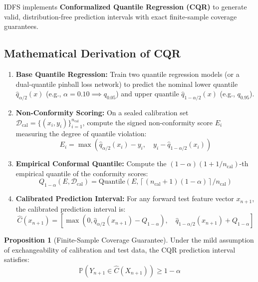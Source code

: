 \documentclass[12pt,a4paper,oneside]{report}
\theoremstyle{definition}
\newtheorem{proposition}{Proposition}[chapter]
\begin{document}
IDFS implements \textbf{Conformalized Quantile Regression (CQR)} to generate valid, distribution-free prediction intervals with exact finite-sample coverage guarantees.

\subsection{Mathematical Derivation of CQR}
\begin{enumerate}
    \item \textbf{Base Quantile Regression:} Train two quantile regression models (or a dual-quantile pinball loss network) to predict the nominal lower quantile $\hat{q}_{\alpha/2}(x)$ (e.g., $\alpha = 0.10 \implies q_{0.05}$) and upper quantile $\hat{q}_{1-\alpha/2}(x)$ (e.g., $q_{0.95}$).
    \item \textbf{Non-Conformity Scoring:} On a sealed calibration set $\mathcal{D}_{\text{cal}} = \{(x_i, y_i)\}_{i=1}^{n_{\text{cal}}}$, compute the signed non-conformity score $E_i$ measuring the degree of quantile violation:
    \begin{equation}
    E_i = \max\left(\hat{q}_{\alpha/2}(x_i) - y_i, \quad y_i - \hat{q}_{1-\alpha/2}(x_i)\right)
    \end{equation}
    \item \textbf{Empirical Conformal Quantile:} Compute the $(1-\alpha)(1 + 1/n_{\text{cal}})$-th empirical quantile of the conformity scores:
    \begin{equation}
    Q_{1-\alpha}(E, \mathcal{D}_{\text{cal}}) = \text{Quantile}\left(E, \left\lceil (n_{\text{cal}} + 1)(1 - \alpha) \right\rceil / n_{\text{cal}}\right)
    \end{equation}
    \item \textbf{Calibrated Prediction Interval:} For any forward test feature vector $x_{n+1}$, the calibrated prediction interval is:
    \begin{equation}
    \hat{C}(x_{n+1}) = \left[ \max\left(0, \hat{q}_{\alpha/2}(x_{n+1}) - Q_{1-\alpha}\right), \quad \hat{q}_{1-\alpha/2}(x_{n+1}) + Q_{1-\alpha} \right]
    \end{equation}
\end{enumerate}

\begin{proposition}[Finite-Sample Coverage Guarantee]
Under the mild assumption of exchangeability of calibration and test data, the CQR prediction interval satisfies:
\begin{equation}
\mathbb{P}\left(Y_{n+1} \in \hat{C}(X_{n+1})\right) \ge 1 - \alpha
\end{equation}
\end{proposition}
\end{document}
